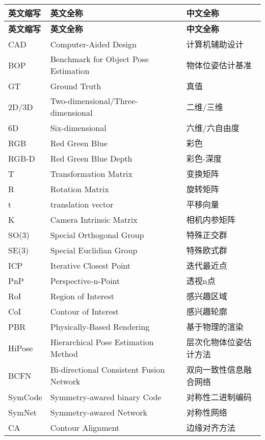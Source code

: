 \cleardoublepage
{}
\begin{center}
    \begin{longtable}{m{2cm}m{8cm}m{5cm}}
        \toprule
        \textbf{英文缩写}&\textbf{英文全称}&\textbf{中文全称}\\
        \midrule
        \endfirsthead
        \toprule
        \textbf{英文缩写}&\textbf{英文全称}&\textbf{中文全称}\\
        \midrule
        \endhead 
        \bottomrule
        \endfoot
        \bottomrule
        \endlastfoot
        CAD&Computer-Aided Design&计算机辅助设计\\
        BOP&Benchmark for Object Pose Estimation&物体位姿估计基准\\
        GT&Ground Truth&真值\\
        2D/3D&Two-dimensional/Three-dimensional&二维/三维\\
        6D&Six-dimensional&六维/六自由度\\
        RGB&Red Green Blue&彩色\\
        RGB-D&Red Green Blue Depth&彩色-深度\\
        T&Transformation Matrix&变换矩阵\\
        R&Rotation Matrix&旋转矩阵\\
        t&translation vector&平移向量\\
        K&Camera Intrinsic Matrix&相机内参矩阵\\
        SO(3)&Special Orthogonal Group&特殊正交群\\
        SE(3)&Special Euclidian Group&特殊欧式群\\
        ICP&Iterative Closest Point&迭代最近点\\
        PnP&Perspective-n-Point&透视n点\\
        RoI&Region of Interest&感兴趣区域\\
        CoI&Contour of Interest&感兴趣轮廓\\
        PBR&Physically-Based Rendering&基于物理的渲染\\
        HiPose& Hierarchical Pose Estimation Method& 层次化物体位姿估计方法\\
        BCFN&Bi-directional Consistent Fusion Network&双向一致性信息融合网络\\
        SymCode&Symmetry-awared binary Code&对称性二进制编码\\
        SymNet&Symmetry-awared Network&对称性网络\\
        CA&Contour Alignment&边缘对齐方法\\
	\end{longtable}
\end{center}